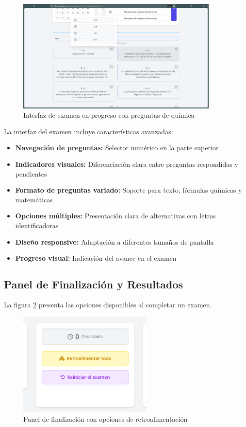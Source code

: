 \documentclass[12pt,a4paper]{report}
\begin{document}
\begin{figure}[h]
\centering
\includegraphics[width=0.9\textwidth]{assets/250617_06h47m26s_screenshot.png}
\caption{Interfaz de examen en progreso con preguntas de química}
\label{fig:examen}
\end{figure}

La interfaz del examen incluye características avanzadas:
\begin{itemize}
\item \textbf{Navegación de preguntas:} Selector numérico en la parte superior
\item \textbf{Indicadores visuales:} Diferenciación clara entre preguntas respondidas y pendientes
\item \textbf{Formato de preguntas variado:} Soporte para texto, fórmulas químicas y matemáticas
\item \textbf{Opciones múltiples:} Presentación clara de alternativas con letras identificadoras
\item \textbf{Diseño responsive:} Adaptación a diferentes tamaños de pantalla
\item \textbf{Progreso visual:} Indicación del avance en el examen
\end{itemize}

\subsection{Panel de Finalización y Resultados}

La figura \ref{fig:resultados} presenta las opciones disponibles al completar un examen.

\begin{figure}[h]
\centering
\includegraphics[width=0.6\textwidth]{assets/250617_06h49m37s_screenshot.png}
\caption{Panel de finalización con opciones de retroalimentación}
\label{fig:resultados}
\end{figure}
\end{document}
